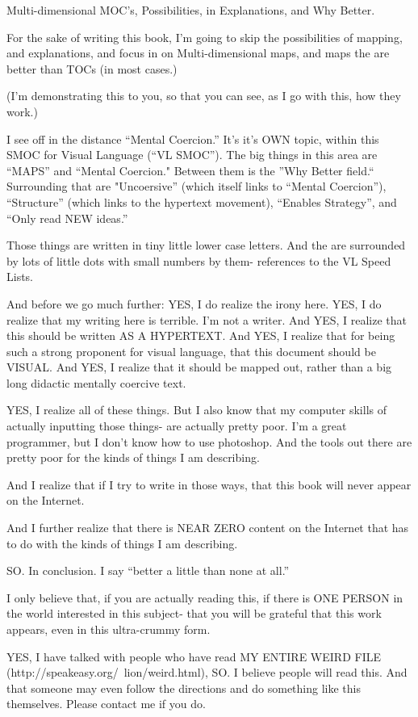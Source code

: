 \documentclass[oneside]{book}
\begin{document}
Multi-dimensional MOC's, Possibilities, in Explanations, and Why
Better.

For the sake of writing this book, I'm going to skip the possibilities
of mapping, and explanations, and focus in on Multi-dimensional maps,
and maps the are better than TOCs (in most cases.)

(I'm demonstrating this to you, so that you can see, as I go with
this, how they work.)

I see off in the distance ``Mental Coercion.'' It's it's OWN topic,
within this SMOC for Visual Language (``VL SMOC''). The big things in
this area are ``MAPS'' and ``Mental Coercion." Between them is the ''Why
Better field.`` Surrounding that are "Uncoersive'' (which itself links
to ``Mental Coercion''), ``Structure'' (which links to the hypertext
movement), ``Enables Strategy'', and ``Only read NEW ideas.''

Those things are written in tiny little lower case letters. And the
are surrounded by lots of little dots with small numbers by them-
references to the VL Speed Lists.

And before we go much further: YES, I do realize the irony here. YES,
I do realize that my writing here is terrible. I'm not a writer. And
YES, I realize that this should be written AS A HYPERTEXT. And YES, I
realize that for being such a strong proponent for visual language,
that this document should be VISUAL. And YES, I realize that it should
be mapped out, rather than a big long didactic mentally coercive text.

YES, I realize all of these things. But I also know that my computer
skills of actually inputting those things- are actually pretty
poor. I'm a great programmer, but I don't know how to use
photoshop. And the tools out there are pretty poor for the kinds of
things I am describing.

And I realize that if I try to write in those ways, that this book
will never appear on the Internet.

And I further realize that there is NEAR ZERO content on the Internet
that has to do with the kinds of things I am describing.

SO. In conclusion. I say ``better a little than none at all.''

I only believe that, if you are actually reading this, if there is ONE
PERSON in the world interested in this subject- that you will be
grateful that this work appears, even in this ultra-crummy form.

YES, I have talked with people who have read MY ENTIRE WEIRD FILE
(http://speakeasy.org/~lion/weird.html), SO. I believe people will
read this. And that someone may even follow the directions and do
something like this themselves. Please contact me if you do.
\end{document}
